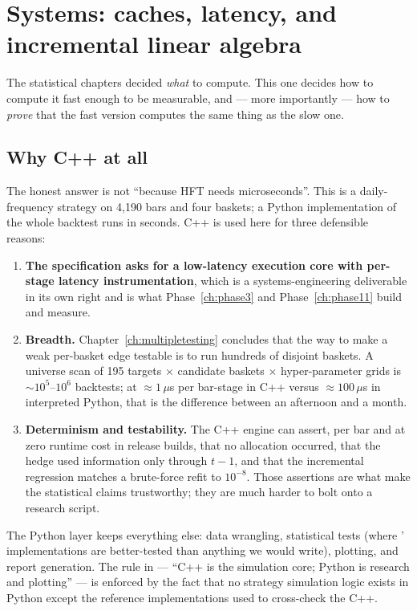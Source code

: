 \section{Systems: caches, latency, and incremental linear algebra}
\label{ch:systems}

The statistical chapters decided \emph{what} to compute. This one decides how to compute
it fast enough to be measurable, and --- more importantly --- how to \emph{prove} that the
fast version computes the same thing as the slow one.

\subsection{Why C++ at all}
\label{sec:sys:why}

The honest answer is not ``because HFT needs microseconds''. This is a daily-frequency
strategy on 4{,}190 bars and four baskets; a Python implementation of the whole backtest
runs in seconds. C++ is used here for three defensible reasons:
\begin{enumerate}
  \item \textbf{The specification asks for a low-latency execution core with per-stage
    latency instrumentation}, which is a systems-engineering deliverable in its own right
    and is what Phase~\ref{ch:phase3} and Phase~\ref{ch:phase11} build and measure.
  \item \textbf{Breadth.} Chapter~\ref{ch:multipletesting} concludes that the way to make
    a weak per-basket edge testable is to run hundreds of disjoint baskets. A universe
    scan of 195 targets $\times$ candidate baskets $\times$ hyper-parameter grids is
    $\sim10^{5}$--$10^{6}$ backtests; at $\approx1\,\mu$s per bar-stage in C++ versus
    $\approx100\,\mu$s in interpreted Python, that is the difference between an afternoon
    and a month.
  \item \textbf{Determinism and testability.} The C++ engine can assert, per bar and at
    zero runtime cost in release builds, that no allocation occurred, that the hedge used
    information only through $t-1$, and that the incremental regression matches a
    brute-force refit to $10^{-8}$. Those assertions are what make the statistical claims
    trustworthy; they are much harder to bolt onto a research script.
\end{enumerate}
The Python layer keeps everything else: data wrangling, statistical tests (where
' implementations are better-tested than anything we would write),
plotting, and report generation. The rule in  --- ``C++ is the simulation
core; Python is research and plotting'' --- is enforced by the fact that no strategy
simulation logic exists in Python except the reference implementations used to
cross-check the C++.

